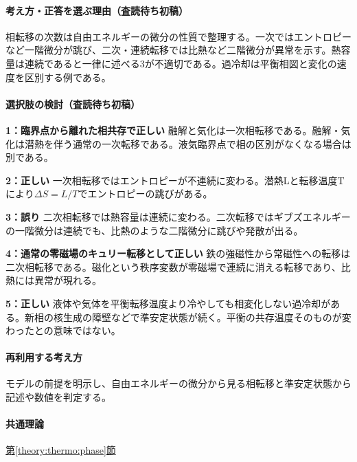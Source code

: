 \paragraph{考え方・正答を選ぶ理由（査読待ち初稿）} 相転移の次数は自由エネルギーの微分の性質で整理する。一次ではエントロピーなど一階微分が跳び、二次・連続転移では比熱など二階微分が異常を示す。熱容量は連続であると一律に述べる3が不適切である。過冷却は平衡相図と変化の速度を区別する例である。

\paragraph{選択肢の検討（査読待ち初稿）}\mbox{}\par

\noindent\textbf{1：臨界点から離れた相共存で正しい} 融解と気化は一次相転移である。融解・気化は潜熱を伴う通常の一次転移である。液気臨界点で相の区別がなくなる場合は別である。\par

\noindent\textbf{2：正しい} 一次相転移ではエントロピーが不連続に変わる。潜熱Lと転移温度Tにより\(\Delta S=L/T\)でエントロピーの跳びがある。\par

\noindent\textbf{3：誤り} 二次相転移では熱容量は連続に変わる。二次転移ではギブズエネルギーの一階微分は連続でも、比熱のような二階微分に跳びや発散が出る。\par

\noindent\textbf{4：通常の零磁場のキュリー転移として正しい} 鉄の強磁性から常磁性への転移は二次相転移である。磁化という秩序変数が零磁場で連続に消える転移であり、比熱には異常が現れる。\par

\noindent\textbf{5：正しい} 液体や気体を平衡転移温度より冷やしても相変化しない過冷却がある。新相の核生成の障壁などで準安定状態が続く。平衡の共存温度そのものが変わったとの意味ではない。\par

\paragraph{再利用する考え方} モデルの前提を明示し、自由エネルギーの微分から見る相転移と準安定状態から記述や数値を判定する。

\paragraph{共通理論} \hyperref[theory:thermo:phase]{第\ref*{theory:thermo:phase}節}

